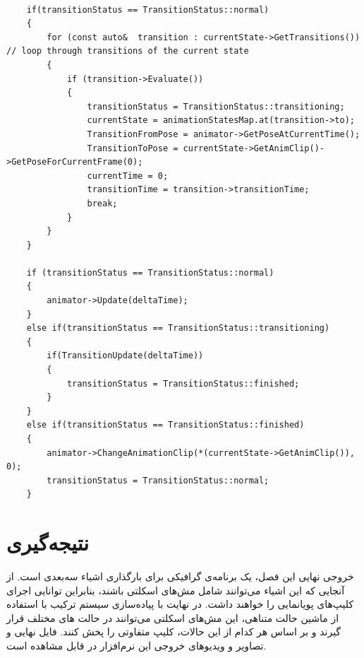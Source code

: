\begin{latin}
	

\begin{lstlisting}

	if(transitionStatus == TransitionStatus::normal) 
	{
		for (const auto&  transition : currentState->GetTransitions()) // loop through transitions of the current state
		{
			if (transition->Evaluate())
			{
				transitionStatus = TransitionStatus::transitioning;
				currentState = animationStatesMap.at(transition->to);
				TransitionFromPose = animator->GetPoseAtCurrentTime();
				TransitionToPose = currentState->GetAnimClip()->GetPoseForCurrentFrame(0);
				currentTime = 0;
				transitionTime = transition->transitionTime;
				break;
			}
		}
	}

	if (transitionStatus == TransitionStatus::normal)
	{
		animator->Update(deltaTime);
	}
	else if(transitionStatus == TransitionStatus::transitioning)
	{
		if(TransitionUpdate(deltaTime)) 
		{
			transitionStatus = TransitionStatus::finished;
		}
	}
	else if(transitionStatus == TransitionStatus::finished)
	{
		animator->ChangeAnimationClip(*(currentState->GetAnimClip()), 0); 
		transitionStatus = TransitionStatus::normal;
	}
\end{lstlisting}

\end{latin}




\section{نتیجه‌گیری}

خروجی نهایی این فصل، یک برنامه‌‌ی گرافیکی برای بارگذاری اشیاء سه‌بعدی است.
از آنجایی که این اشیاء می‌‌توانند شامل مش‌های اسکلتی باشند، بنابراین توانایی اجرای 
کلیپ‌های پویانمایی را خواهند داشت. در نهایت با پیاده‌سازی سیستم ترکیب با استفاده از 
ماشین حالت متناهی، این مش‌های اسکلتی می‌توانند در حالت های مختلف قرار گیرند 
و بر اساس هر کدام از این حالات، کلیپ متفاوتی را پخش کنند.
فایل نهایی و تصاویر و ویدیو‌های خروجی این نرم‌افزار در 
\cite{GithubSkeletalAnimation}
قابل مشاهده است.
